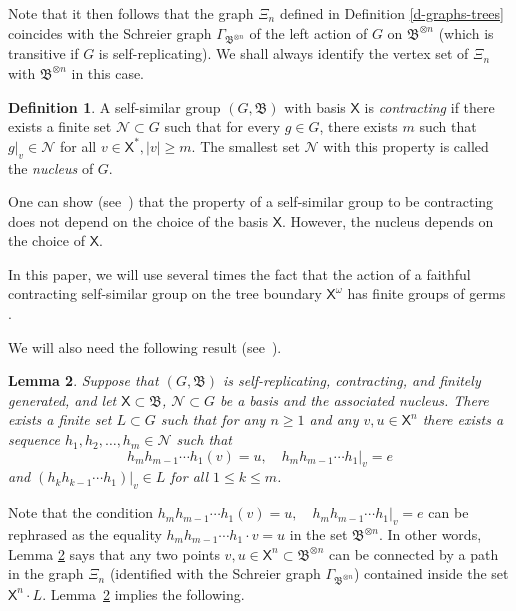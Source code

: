 \documentclass[11pt]{amsart}
\newcommand{\bim}{\mathfrak{B}}
\newcommand{\xo}{\alb^\omega}
\newcommand{\alb}{\ensuremath{\mathsf{X}}}%
\newcommand{\nuke}{\ensuremath{\mathcal{N}}}%
\theoremstyle{definition}
\newtheorem{defin}{Definition}[section]
\theoremstyle{plain}
\newtheorem{main thm}{Theorem}
\newtheorem{lemma}[defin]{Lemma}
\theoremstyle{remark}
\theoremstyle{plain}
\begin{document}
Note that it then follows that the graph $\Xi_n$ defined in Definition \ref{d-graphs-trees} coincides with the Schreier graph $\Gamma_{\bim^{\otimes n}}$ of the left action of $G$ on $\bim^{\otimes n}$ (which is transitive if $G$ is self-replicating). We shall always identify the vertex set of $\Xi_n$ with $\bim^{\otimes n}$ in this case.


\begin{defin} \label{def:contracting}
    A self-similar group $(G, \bim)$ with basis $\alb$ is \emph{contracting} if there exists a finite set $\nuke\subset G$ such that for every $g\in G$, there exists $m$ such that $g|_v\in \nuke$ for all $v\in \alb^*,|v|\ge m$. The smallest set $\nuke$ with this property is called the \emph{nucleus} of $G$. 
\end{defin}


One can show (see~\cite[Corollary 2.11.7]{Nek:book}) that the property of a self-similar group to be contracting does not depend on the choice of the basis $\alb$. However, the nucleus depends on the choice of $\alb$.

In this paper, we will use several times the fact that the action of a faithful contracting self-similar group on the tree boundary $\xo$ has finite groups of germs \cite[Proposition 4.1]{Nek:free}.

We will also need the following result (see~\cite[Lemma~3.5.2]{Nek:book}).
\begin{lemma}
\label{lem:connectivityB}
Suppose that $(G, \bim)$ is self-replicating, contracting, and finitely generated, and let $\alb\subset\bim$, $\nuke\subset G$ be a basis and the associated nucleus. There exists a finite set $L\subset G$ such that for any $n\ge 1$ and any $v, u\in\alb^n$ there exists a sequence $h_1, h_2, \ldots, h_m\in\nuke$ such that
\[h_mh_{m-1}\cdots h_1(v)=u, \quad h_mh_{m-1}\cdots h_1|_v=e\]
 and $(h_kh_{k-1}\cdots h_1)|_v\in L$ for all $1\le k\le m$.


\end{lemma}

Note that the condition $h_mh_{m-1}\cdots h_1(v)=u, \quad h_mh_{m-1}\cdots h_1|_v=e$ can be rephrased as the equality $h_mh_{m-1}\cdots h_1 \cdot v=u$
in the set $\bim^{\otimes n}$. In other words, Lemma \ref{lem:connectivityB} says that any two points $v, u\in\alb^n\subset \bim^{\otimes n}$ can be connected by a path in the graph $\Xi_n$ (identified with the Schreier graph $\Gamma_{\bim^{\otimes n}}$) contained inside the set $\alb^n\cdot L$. Lemma~\ref{lem:connectivityB} implies the following.
\end{document}
